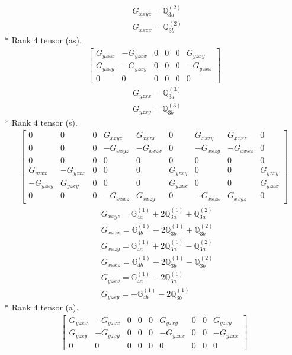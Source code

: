 \documentclass[fleqn,8pt,landscape]{jsarticle}
\begin{document}
\begin{align*}
& G_{xxyz} = \mathbb{Q}_{3a}^{(2)} \\
& G_{xxzx} = \mathbb{Q}_{3b}^{(2)}
\end{align*}
* Rank 4 tensor (as).
\begin{align*}
\begin{bmatrix} G_{yzxx} & - G_{yzxx} & 0 & 0 & 0 & G_{yzxy} \\ G_{yzxy} & - G_{yzxy} & 0 & 0 & 0 & - G_{yzxx} \\ 0 & 0 & 0 & 0 & 0 & 0 \end{bmatrix}
\end{align*}
\begin{align*}
& G_{yzxx} = \mathbb{Q}_{3a}^{(3)} \\
& G_{yzxy} = \mathbb{Q}_{3b}^{(3)}
\end{align*}
* Rank 4 tensor (s).
\begin{align*}
\begin{bmatrix} 0 & 0 & 0 & G_{xxyz} & G_{xxzx} & 0 & G_{xxzy} & G_{xxxz} & 0 \\ 0 & 0 & 0 & - G_{xxyz} & - G_{xxzx} & 0 & - G_{xxzy} & - G_{xxxz} & 0 \\ 0 & 0 & 0 & 0 & 0 & 0 & 0 & 0 & 0 \\ G_{yzxx} & - G_{yzxx} & 0 & 0 & 0 & G_{yzxy} & 0 & 0 & G_{yzxy} \\ - G_{yzxy} & G_{yzxy} & 0 & 0 & 0 & G_{yzxx} & 0 & 0 & G_{yzxx} \\ 0 & 0 & 0 & - G_{xxxz} & G_{xxzy} & 0 & - G_{xxzx} & G_{xxyz} & 0 \end{bmatrix}
\end{align*}
\begin{align*}
& G_{xxyz} = \mathbb{G}_{4a}^{(1)} + 2 \mathbb{Q}_{3a}^{(1)} + \mathbb{Q}_{3a}^{(2)} \\
& G_{xxzx} = \mathbb{G}_{4b}^{(1)} - 2 \mathbb{Q}_{3b}^{(1)} + \mathbb{Q}_{3b}^{(2)} \\
& G_{xxzy} = \mathbb{G}_{4a}^{(1)} + 2 \mathbb{Q}_{3a}^{(1)} - \mathbb{Q}_{3a}^{(2)} \\
& G_{xxxz} = \mathbb{G}_{4b}^{(1)} - 2 \mathbb{Q}_{3b}^{(1)} - \mathbb{Q}_{3b}^{(2)} \\
& G_{yzxx} = \mathbb{G}_{4a}^{(1)} - 2 \mathbb{Q}_{3a}^{(1)} \\
& G_{yzxy} = - \mathbb{G}_{4b}^{(1)} - 2 \mathbb{Q}_{3b}^{(1)}
\end{align*}
* Rank 4 tensor (a).
\begin{align*}
\begin{bmatrix} G_{yzxx} & - G_{yzxx} & 0 & 0 & 0 & G_{yzxy} & 0 & 0 & G_{yzxy} \\ G_{yzxy} & - G_{yzxy} & 0 & 0 & 0 & - G_{yzxx} & 0 & 0 & - G_{yzxx} \\ 0 & 0 & 0 & 0 & 0 & 0 & 0 & 0 & 0 \end{bmatrix}
\end{align*}
\end{document}
